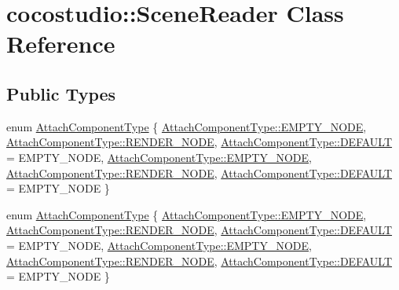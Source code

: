 \hypertarget{classcocostudio_1_1SceneReader}{}\section{cocostudio\+:\+:Scene\+Reader Class Reference}
\label{classcocostudio_1_1SceneReader}
\subsection*{Public Types}
\begin{DoxyCompactItemize}
\item 
enum \hyperlink{classcocostudio_1_1SceneReader_ae79446a46e4d2fecfe754382fc2ec24a}{Attach\+Component\+Type} \{ \newline
\hyperlink{classcocostudio_1_1SceneReader_ae79446a46e4d2fecfe754382fc2ec24aa78b78d6b8a3e32acb73e0fdb30a7ffef}{Attach\+Component\+Type\+::\+E\+M\+P\+T\+Y\+\_\+\+N\+O\+DE}, 
\hyperlink{classcocostudio_1_1SceneReader_ae79446a46e4d2fecfe754382fc2ec24aa6e719610fba1dc4991c2769afd61fbcc}{Attach\+Component\+Type\+::\+R\+E\+N\+D\+E\+R\+\_\+\+N\+O\+DE}, 
\hyperlink{classcocostudio_1_1SceneReader_ae79446a46e4d2fecfe754382fc2ec24aa5b39c8b553c821e7cddc6da64b5bd2ee}{Attach\+Component\+Type\+::\+D\+E\+F\+A\+U\+LT} = E\+M\+P\+T\+Y\+\_\+\+N\+O\+DE, 
\hyperlink{classcocostudio_1_1SceneReader_ae79446a46e4d2fecfe754382fc2ec24aa78b78d6b8a3e32acb73e0fdb30a7ffef}{Attach\+Component\+Type\+::\+E\+M\+P\+T\+Y\+\_\+\+N\+O\+DE}, 
\newline
\hyperlink{classcocostudio_1_1SceneReader_ae79446a46e4d2fecfe754382fc2ec24aa6e719610fba1dc4991c2769afd61fbcc}{Attach\+Component\+Type\+::\+R\+E\+N\+D\+E\+R\+\_\+\+N\+O\+DE}, 
\hyperlink{classcocostudio_1_1SceneReader_ae79446a46e4d2fecfe754382fc2ec24aa5b39c8b553c821e7cddc6da64b5bd2ee}{Attach\+Component\+Type\+::\+D\+E\+F\+A\+U\+LT} = E\+M\+P\+T\+Y\+\_\+\+N\+O\+DE
 \}
\item 
enum \hyperlink{classcocostudio_1_1SceneReader_ae79446a46e4d2fecfe754382fc2ec24a}{Attach\+Component\+Type} \{ \newline
\hyperlink{classcocostudio_1_1SceneReader_ae79446a46e4d2fecfe754382fc2ec24aa78b78d6b8a3e32acb73e0fdb30a7ffef}{Attach\+Component\+Type\+::\+E\+M\+P\+T\+Y\+\_\+\+N\+O\+DE}, 
\hyperlink{classcocostudio_1_1SceneReader_ae79446a46e4d2fecfe754382fc2ec24aa6e719610fba1dc4991c2769afd61fbcc}{Attach\+Component\+Type\+::\+R\+E\+N\+D\+E\+R\+\_\+\+N\+O\+DE}, 
\hyperlink{classcocostudio_1_1SceneReader_ae79446a46e4d2fecfe754382fc2ec24aa5b39c8b553c821e7cddc6da64b5bd2ee}{Attach\+Component\+Type\+::\+D\+E\+F\+A\+U\+LT} = E\+M\+P\+T\+Y\+\_\+\+N\+O\+DE, 
\hyperlink{classcocostudio_1_1SceneReader_ae79446a46e4d2fecfe754382fc2ec24aa78b78d6b8a3e32acb73e0fdb30a7ffef}{Attach\+Component\+Type\+::\+E\+M\+P\+T\+Y\+\_\+\+N\+O\+DE}, 
\newline
\hyperlink{classcocostudio_1_1SceneReader_ae79446a46e4d2fecfe754382fc2ec24aa6e719610fba1dc4991c2769afd61fbcc}{Attach\+Component\+Type\+::\+R\+E\+N\+D\+E\+R\+\_\+\+N\+O\+DE}, 
\hyperlink{classcocostudio_1_1SceneReader_ae79446a46e4d2fecfe754382fc2ec24aa5b39c8b553c821e7cddc6da64b5bd2ee}{Attach\+Component\+Type\+::\+D\+E\+F\+A\+U\+LT} = E\+M\+P\+T\+Y\+\_\+\+N\+O\+DE
 \}
\end{DoxyCompactItemize}

